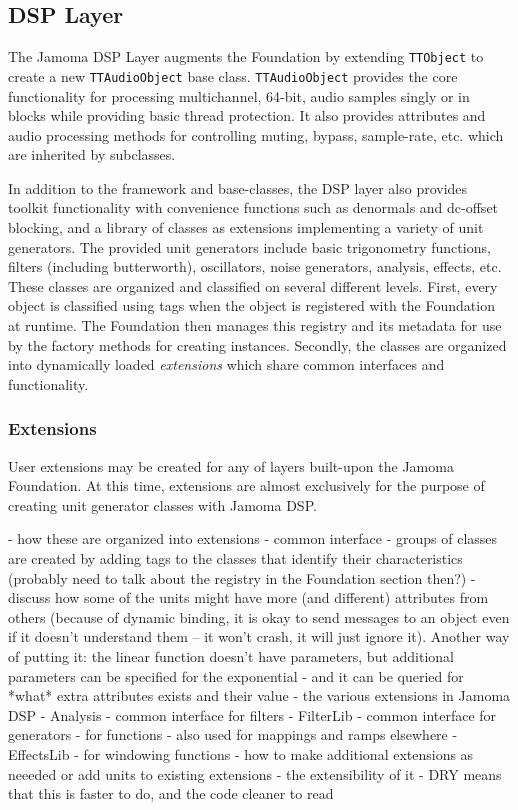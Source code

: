 \documentclass[twoside,10pt]{article}
\begin{document}


\subsection{DSP Layer} %

The Jamoma DSP Layer \cite{web9} augments the Foundation by extending \texttt{\small{TTObject}} to create a new \texttt{\small{TTAudioObject}} base class.  \texttt{\small{TTAudioObject}} provides the core functionality for processing multichannel, 64-bit, audio samples singly or in blocks while providing basic thread protection.  It also provides attributes and audio processing methods for controlling muting, bypass, sample-rate, etc. which are inherited by subclasses.

In addition to the framework and base-classes, the DSP layer also provides toolkit functionality with convenience functions such as denormals and dc-offset blocking, and a library of classes as extensions implementing a variety of unit generators.  The provided unit generators include basic trigonometry functions, filters (including butterworth), oscillators, noise generators, analysis, effects, etc.  These classes are organized and classified on several different levels.  First, every object is classified using tags when the object is registered with the Foundation at runtime.  The Foundation then manages this registry and its metadata for use by the factory methods for creating instances.  Secondly, the classes are organized into dynamically loaded \emph{extensions} which share common interfaces and functionality.

\subsubsection{Extensions}

User extensions may be created for any of layers built-upon the Jamoma Foundation.  At this time, extensions are almost exclusively for the purpose of creating unit generator classes with Jamoma DSP.


- how these are organized into extensions 
    - common interface
    - groups of classes are created by adding tags to the classes that identify their characteristics (probably need to talk about the registry in the Foundation section then?)
    - discuss how some of the units might have more (and different) attributes from others (because of dynamic binding, it is okay to send messages to an object even if it doesn't understand them -- it won't crash, it will just ignore it). Another way of putting it: the linear function doesn't have parameters, but additional parameters can be specified for the exponential - and it can be queried for *what* extra attributes exists and their value
- the various extensions in Jamoma DSP
    - Analysis
    - common interface for filters - FilterLib
    - common interface for generators
    - for functions - also used for mappings and ramps elsewhere
    - EffectsLib
    - for windowing functions
- how to make additional extensions as neeeded or add units to existing extensions
    - the extensibility of it 
    - DRY means that this is faster to do, and the code cleaner to read
\end{document}
